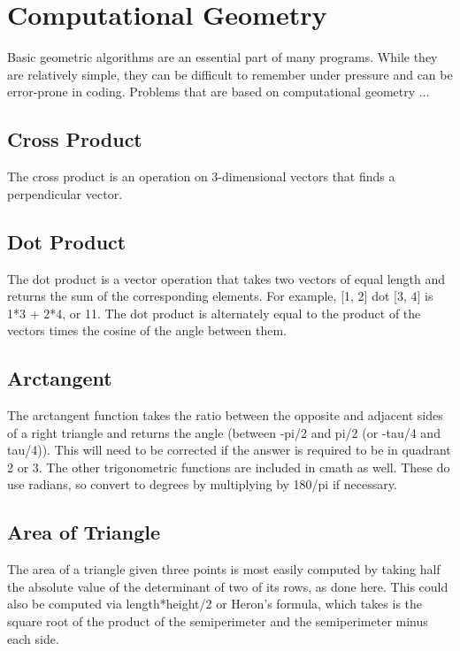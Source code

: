 \section{Computational Geometry}
Basic geometric algorithms are an essential part of many programs. While they are relatively simple, they can be difficult to remember under pressure and can be error-prone in coding. Problems that are based on computational geometry ...

\subsection{Cross Product}
The cross product is an operation on 3-dimensional vectors that finds a perpendicular vector.


\subsection{Dot Product}
The dot product is a vector operation that takes two vectors of equal length and returns the sum of the corresponding elements. For example, [1, 2] dot [3, 4] is 1*3 + 2*4, or 11. The dot product is alternately equal to the product of the vectors times the cosine of the angle between them.


\subsection{Arctangent}
The arctangent function takes the ratio between the opposite and adjacent sides of a right triangle and returns the angle (between -pi/2 and pi/2 (or -tau/4 and tau/4)). This will need to be corrected if the answer is required to be in quadrant 2 or 3. The other trigonometric functions are included in cmath as well. These do use radians, so convert to degrees by multiplying by 180/pi if necessary.


\subsection{Area of Triangle}
The area of a triangle given three points is most easily computed by taking half the absolute value of the determinant of two of its rows, as done here. This could also be computed via length*height/2 or Heron's formula, which takes is the square root of the product of the semiperimeter and the semiperimeter minus each side.



